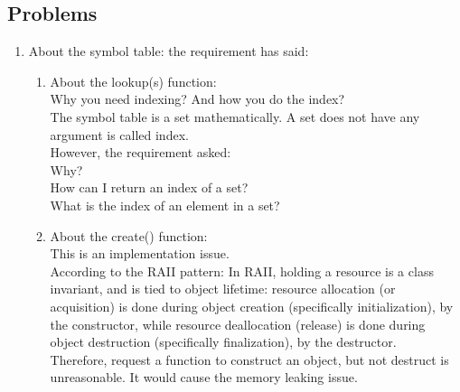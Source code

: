 \documentclass[12pt,a4paper]{article}
\begin{document}
\begin{CJK}{UTF8}{bsmi}
    \section{Problems}
    \begin{enumerate}
        \item About the symbol table:
              the requirement has said:\\
              \begin{enumerate}
                  \item About the lookup(s) function:\\
                        Why you need indexing? And how you do the index?\\
                        The symbol table is a set mathematically. A set does not have any argument is called
                        index.\\
                        However, the requirement asked:\\
                        Why?\\
                        How can I return an index of a set?\\
                        What is the index of an element in a set?
                  \item About the create() function:\\
                        This is an implementation issue.\\
                        According to the RAII pattern: In RAII, holding a resource is a
                        class invariant, and is tied to object lifetime: resource allocation
                        (or acquisition) is done during object creation (specifically
                        initialization), by the constructor, while resource deallocation
                        (release) is done during object destruction (specifically finalization),
                        by the destructor. \\
                        Therefore, request a function to construct an object, but not destruct
                        is unreasonable. It would cause the memory leaking issue.


\end{enumerate}
\end{enumerate}
\end{CJK}
\end{document}
